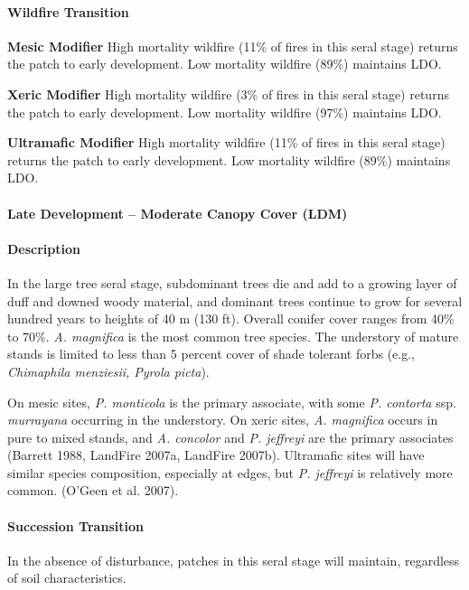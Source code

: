 \paragraph{Wildfire Transition}
\begin{adjustwidth}{2cm}{}
\noindent \textbf{Mesic Modifier } High mortality wildfire (11\% of fires in this seral stage) returns the patch to early development. Low mortality wildfire (89\%) maintains LDO. 

\medskip
\noindent \textbf{Xeric Modifier} High mortality wildfire (3\% of fires in this seral stage) returns the patch to early development. Low mortality wildfire (97\%) maintains LDO. 

\medskip
\noindent \textbf{Ultramafic Modifier} High mortality wildfire (11\% of fires in this seral stage) returns the patch to early development. Low mortality wildfire (89\%) maintains LDO.

\end{adjustwidth}

\noindent\hrulefill

\paragraph{Late Development – Moderate Canopy Cover (LDM)}

\paragraph{Description} In the large tree seral stage, subdominant trees die and add to a growing layer of duff and downed woody material, and dominant trees continue to grow for several hundred years to heights of 40 m (130 ft). Overall conifer cover ranges from 40\% to 70\%. \emph{A. magnifica} is the most common tree species. The understory of mature stands is limited to less than 5 percent cover of shade tolerant forbs (e.g., \emph{Chimaphila menziesii, Pyrola picta}). 

On mesic sites, \emph{P. monticola} is the primary associate, with some \emph{P. contorta} ssp. \emph{murrayana} occurring in the understory. On xeric sites, \emph{A. magnifica} occurs in pure to mixed stands, and \emph{A. concolor} and \emph{P. jeffreyi} are the primary associates (Barrett 1988, LandFire 2007a, LandFire 2007b). Ultramafic sites will have similar species composition, especially at edges, but \emph{P. jeffreyi} is relatively more common. (O'Geen et al. 2007).


\paragraph{Succession Transition} In the absence of disturbance, patches in this seral stage will maintain, regardless of soil characteristics.

